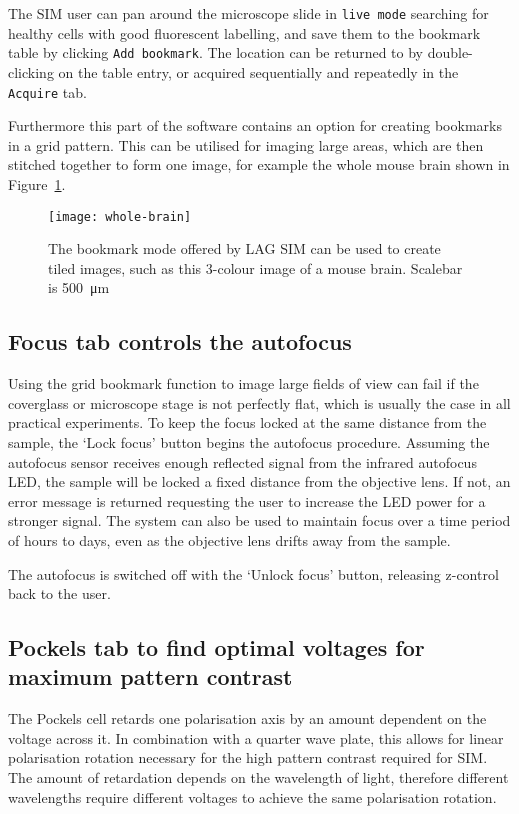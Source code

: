 The SIM user can pan around the microscope slide in \texttt{live mode} searching for healthy cells with good fluorescent labelling, and save them to the bookmark table by clicking \texttt{Add bookmark}. 
The location can be returned to by double-clicking on the table entry, or acquired sequentially and repeatedly in the \texttt{Acquire} tab. 

Furthermore this part of the software contains an option for creating bookmarks in a grid pattern. 
This can be utilised for imaging large areas, which are then stitched together to form one image, for example the whole mouse brain shown in Figure~\ref{fig:wholebrain}. 

\begin{figure}[p]
\centering
\texttt{[image: whole-brain]}
\caption[LAG SIM: An image of a full mouse brain can be captured as a mosaic of images]{The bookmark mode offered by LAG SIM can be used to create tiled images, such as this 3-colour image of a mouse brain. Scalebar is \SI{500}{\micro\metre}}
\label{fig:wholebrain}
\end{figure}

\subsection{Focus tab controls the autofocus} \label{sec:lagsimFocus}
Using the grid bookmark function to image large fields of view can fail if the coverglass or microscope stage is not perfectly flat, which is usually the case in all practical experiments. 
To keep the focus locked at the same distance from the sample, the `Lock focus' button begins the autofocus procedure. 
Assuming the autofocus sensor receives enough reflected signal from the infrared autofocus LED, the sample will be locked a fixed distance from the objective lens. 
If not, an error message is returned requesting the user to increase the LED power for a stronger signal. 
The system can also be used to maintain focus over a time period of hours to days, even as the objective lens drifts away from the sample. 

The autofocus is switched off with the `Unlock focus' button, releasing z-control back to the user. 

\subsection{Pockels tab to find optimal voltages for maximum pattern contrast} 
The Pockels cell retards one polarisation axis by an amount dependent on the voltage across it. 
In combination with a quarter wave plate, this allows for linear polarisation rotation necessary for the high pattern contrast required for SIM. 
The amount of retardation depends on the wavelength of light, therefore different wavelengths require different voltages to achieve the same polarisation rotation. 

